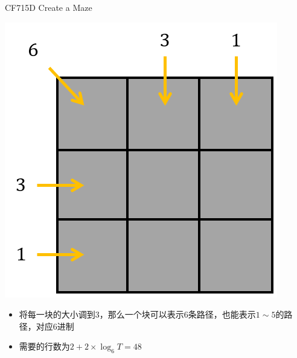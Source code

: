 \documentclass{beamer}
\begin{document}
\begin{frame}{CF715D Create a Maze}
    \begin{center}
        \includegraphics[scale = 0.5]{2.png}
    \end{center}
    \begin{itemize}
        \item 将每一块的大小调到$3$，那么一个块可以表示$6$条路径，也能表示$1\sim 5$的路径，对应$6$进制
        \item 需要的行数为$2 + 2\times \log_6T = 48$
    \end{itemize}
\end{frame}
\end{document}
